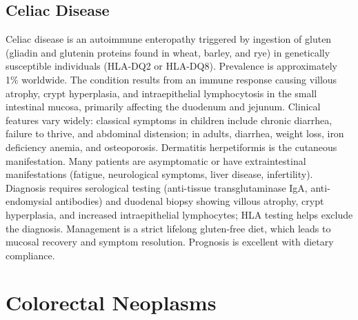 

\label{sec:section:Celiac Disease}

\subsection{Celiac Disease}
\label{sec:Celiac Disease}
Celiac disease is an autoimmune enteropathy triggered by ingestion of gluten (gliadin and glutenin proteins found in wheat, barley, and rye) in genetically susceptible individuals (HLA-DQ2 or HLA-DQ8). Prevalence is approximately 1\% worldwide. The condition results from an immune response causing villous atrophy, crypt hyperplasia, and intraepithelial lymphocytosis in the small intestinal mucosa, primarily affecting the duodenum and jejunum. Clinical features vary widely: classical symptoms in children include chronic diarrhea, failure to thrive, and abdominal distension; in adults, diarrhea, weight loss, iron deficiency anemia, and osteoporosis. Dermatitis herpetiformis is the cutaneous manifestation. Many patients are asymptomatic or have extraintestinal manifestations (fatigue, neurological symptoms, liver disease, infertility). Diagnosis requires serological testing (anti-tissue transglutaminase IgA, anti-endomysial antibodies) and duodenal biopsy showing villous atrophy, crypt hyperplasia, and increased intraepithelial lymphocytes; HLA testing helps exclude the diagnosis. Management is a strict lifelong gluten-free diet, which leads to mucosal recovery and symptom resolution. Prognosis is excellent with dietary compliance.

\section{Colorectal Neoplasms}




